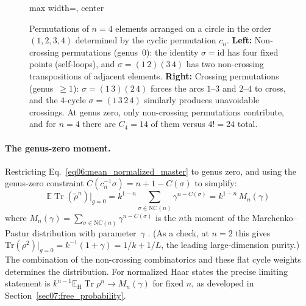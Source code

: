 \documentclass[11pt,letterpaper]{article}
\theoremstyle{plain}
\theoremstyle{definition}
\theoremstyle{remark}
\begin{document}
\begin{figure}[htbp]
\begin{adjustbox}{max width=\textwidth, center}
\end{adjustbox}
\caption{Permutations of $n=4$ elements arranged on a circle in the order
$(1,2,3,4)$ determined by the cyclic permutation $c_n$.  \textbf{Left:}
Non-crossing permutations (genus~$0$): the identity $\sigma = \mathrm{id}$ has
four fixed points (self-loops), and $\sigma = (1\,2)(3\,4)$ has two
non-crossing transpositions of adjacent elements.  \textbf{Right:} Crossing
permutations (genus~$\geq 1$): $\sigma = (1\,3)(2\,4)$ forces the arcs
$1$--$3$ and $2$--$4$ to cross, and the $4$-cycle $\sigma = (1\,3\,2\,4)$
similarly produces unavoidable crossings.  At genus zero, only non-crossing
permutations contribute, and for $n = 4$ there are $C_4 = 14$ of them versus
$4! = 24$ total.}
\label{fig06:non_crossing}
\end{figure}

\paragraph{The genus-zero moment.}
Restricting Eq.~\eqref{eq06:mean_normalized_master} to genus zero, and
using the genus-zero constraint $C(c_n^{-1}\sigma) = n + 1 - C(\sigma)$ to
simplify:
\begin{equation}
\label{eq06:genus_zero_moment}
\boxed{
\mathbb E\operatorname{Tr}(\widetilde\rho^n)\big|_{g=0}
  = k^{1-n} \sum_{\sigma \in \mathrm{NC}(n)} \gamma^{n - C(\sigma)}
  = k^{1-n} \, M_n(\gamma)
}
\end{equation}
where $M_n(\gamma) = \sum_{\sigma \in \mathrm{NC}(n)} \gamma^{n - C(\sigma)}$
is the $n$th moment of the Marchenko--Pastur distribution with
parameter~$\gamma$ \citep{marchenkopastur1967}.  (As a check, at $n = 2$ this
gives $\mathrm{Tr}(\rho^2)|_{g=0} = k^{-1}(1 + \gamma) = 1/k + 1/L$, the leading large-dimension purity.)  The combination of the non-crossing combinatorics and these flat cycle weights
determines the distribution.  For normalized Haar states the precise limiting
statement is $k^{n-1}\mathbb E_{\mathrm H}\operatorname{Tr}\rho^n
\to M_n(\gamma)$ for fixed $n$, as developed in
Section~\ref{sec07:free_probability}.
\end{document}
